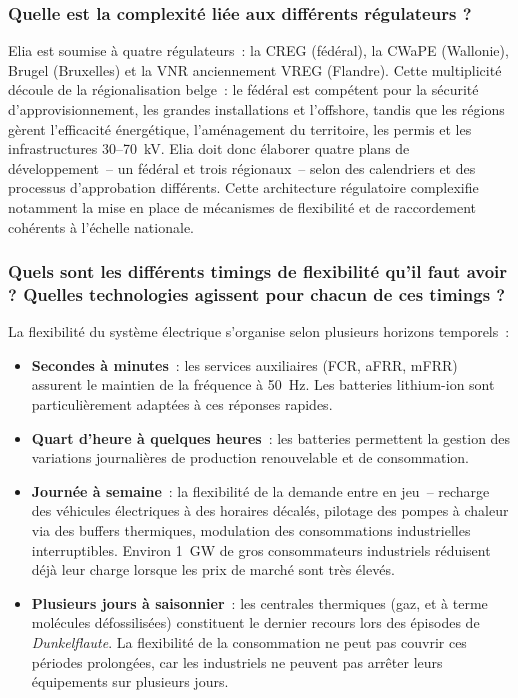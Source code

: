 \subsubsection{Quelle est la complexité liée aux différents régulateurs ?}

Elia est soumise à quatre régulateurs~: la CREG (fédéral), la CWaPE (Wallonie), Brugel (Bruxelles) et la VNR anciennement VREG (Flandre). Cette multiplicité découle de la régionalisation belge~: le fédéral est compétent pour la sécurité d'approvisionnement, les grandes installations et l'offshore, tandis que les régions gèrent l'efficacité énergétique, l'aménagement du territoire, les permis et les infrastructures 30--70~kV. Elia doit donc élaborer quatre plans de développement~-- un fédéral et trois régionaux~-- selon des calendriers et des processus d'approbation différents. Cette architecture régulatoire complexifie notamment la mise en place de mécanismes de flexibilité et de raccordement cohérents à l'échelle nationale.

\subsubsection{Quels sont les différents timings de flexibilité qu'il faut avoir ? Quelles technologies agissent pour chacun de ces timings ?}

La flexibilité du système électrique s'organise selon plusieurs horizons temporels~:

\begin{itemize}
    \item \textbf{Secondes à minutes}~: les services auxiliaires (FCR, aFRR, mFRR) assurent le maintien de la fréquence à 50~Hz. Les batteries lithium-ion sont particulièrement adaptées à ces réponses rapides.
    \item \textbf{Quart d'heure à quelques heures}~: les batteries permettent la gestion des variations journalières de production renouvelable et de consommation.
    \item \textbf{Journée à semaine}~: la flexibilité de la demande entre en jeu~-- recharge des véhicules électriques à des horaires décalés, pilotage des pompes à chaleur via des buffers thermiques, modulation des consommations industrielles interruptibles. Environ 1~GW de gros consommateurs industriels réduisent déjà leur charge lorsque les prix de marché sont très élevés.
    \item \textbf{Plusieurs jours à saisonnier}~: les centrales thermiques (gaz, et à terme molécules défossilisées) constituent le dernier recours lors des épisodes de \textit{Dunkelflaute}. La flexibilité de la consommation ne peut pas couvrir ces périodes prolongées, car les industriels ne peuvent pas arrêter leurs équipements sur plusieurs jours.
\end{itemize}

